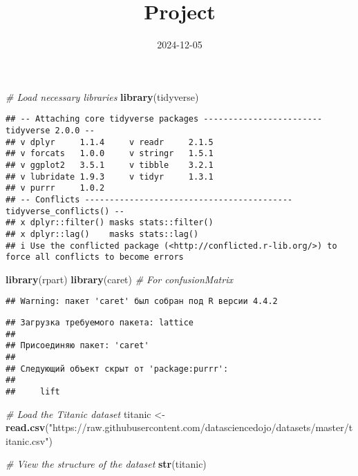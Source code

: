 \documentclass[
]{article}
\title{Project}
\author{}
\date{\vspace{-2.5em}2024-12-05}
\newenvironment{Shaded}{\begin{snugshade}}{\end{snugshade}}
\newcommand{\CommentTok}[1]{\textcolor[rgb]{0.56,0.35,0.01}{\textit{#1}}}
\newcommand{\FunctionTok}[1]{\textcolor[rgb]{0.13,0.29,0.53}{\textbf{#1}}}
\newcommand{\NormalTok}[1]{#1}
\newcommand{\OtherTok}[1]{\textcolor[rgb]{0.56,0.35,0.01}{#1}}
\newcommand{\StringTok}[1]{\textcolor[rgb]{0.31,0.60,0.02}{#1}}
\begin{document}
\maketitle

\begin{Shaded}
\begin{Highlighting}[]
\CommentTok{\# Load necessary libraries}
\FunctionTok{library}\NormalTok{(tidyverse)}
\end{Highlighting}
\end{Shaded}

\begin{verbatim}
## -- Attaching core tidyverse packages ------------------------ tidyverse 2.0.0 --
## v dplyr     1.1.4     v readr     2.1.5
## v forcats   1.0.0     v stringr   1.5.1
## v ggplot2   3.5.1     v tibble    3.2.1
## v lubridate 1.9.3     v tidyr     1.3.1
## v purrr     1.0.2     
## -- Conflicts ------------------------------------------ tidyverse_conflicts() --
## x dplyr::filter() masks stats::filter()
## x dplyr::lag()    masks stats::lag()
## i Use the conflicted package (<http://conflicted.r-lib.org/>) to force all conflicts to become errors
\end{verbatim}

\begin{Shaded}
\begin{Highlighting}[]
\FunctionTok{library}\NormalTok{(rpart)}
\FunctionTok{library}\NormalTok{(caret)  }\CommentTok{\# For confusionMatrix}
\end{Highlighting}
\end{Shaded}

\begin{verbatim}
## Warning: пакет 'caret' был собран под R версии 4.4.2
\end{verbatim}

\begin{verbatim}
## Загрузка требуемого пакета: lattice
## 
## Присоединяю пакет: 'caret'
## 
## Следующий объект скрыт от 'package:purrr':
## 
##     lift
\end{verbatim}

\begin{Shaded}
\begin{Highlighting}[]
\CommentTok{\# Load the Titanic dataset}
\NormalTok{titanic }\OtherTok{\textless{}{-}} \FunctionTok{read.csv}\NormalTok{(}\StringTok{"https://raw.githubusercontent.com/datasciencedojo/datasets/master/titanic.csv"}\NormalTok{)}

\CommentTok{\# View the structure of the dataset}
\FunctionTok{str}\NormalTok{(titanic)}
\end{Highlighting}
\end{Shaded}
\end{document}

